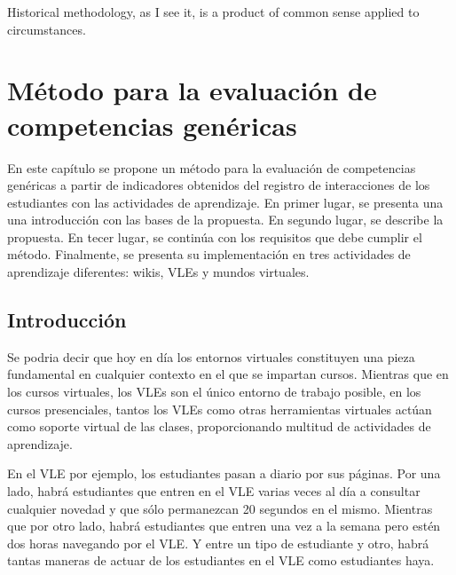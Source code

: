 

\begin{savequote}[50mm]
Historical methodology, as I see it, is a product of common sense applied to circumstances. 
\end{savequote}


\chapter{Método para la evaluación de competencias genéricas}
\label{cha:Overall methodology}

\ifpdf
    \graphicspath{{4_overall_methodology/figures/PNG/}{4_overall_methodology/figures/PDF/}{4_overall_methodology/figures/}}
\else
    \graphicspath{{4_overall_methodology/figures/EPS/}{4_overall_methodology/figures/}}
\fi



En este capítulo se propone un método para la evaluación de competencias genéricas a partir de indicadores obtenidos del registro de interacciones de los estudiantes con las actividades de aprendizaje. En primer lugar, se presenta una una introducción con las bases de la propuesta. En segundo lugar, se describe la propuesta. En tecer lugar, se continúa con los requisitos que debe cumplir el método. Finalmente, se presenta su implementación en tres actividades de aprendizaje diferentes: wikis, VLEs y mundos virtuales.

\section{Introducción}

Se podria decir que hoy en día los entornos virtuales constituyen una pieza fundamental en cualquier contexto en el que se impartan cursos. Mientras que en los cursos virtuales, los VLEs son el único entorno de trabajo posible, en los cursos presenciales, tantos los VLEs como otras herramientas virtuales actúan como soporte virtual de las clases, proporcionando multitud de actividades de aprendizaje. 

En el VLE por ejemplo, los estudiantes pasan a diario por sus páginas. Por una lado, habrá estudiantes que entren en el VLE varias veces al día a consultar cualquier novedad y que sólo permanezcan 20 segundos en el mismo. Mientras que por otro lado, habrá estudiantes que entren una vez a la semana pero estén dos horas navegando por el VLE. Y entre un tipo de estudiante y otro, habrá tantas maneras de actuar de los estudiantes en el VLE como estudiantes haya. 

